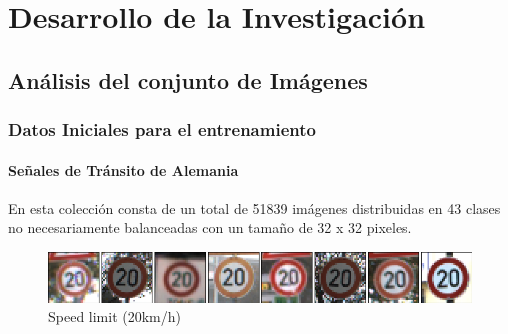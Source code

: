 \chapter{Desarrollo de la Investigación}
\setcounter{page}{59}
\renewcommand{\baselinestretch}{2} %

\section{Análisis del conjunto de Imágenes}

	\subsection{Datos Iniciales para el entrenamiento}

		\subsubsection{Señales de Tránsito de Alemania}

			En esta colección consta de un total de 51839 imágenes distribuidas en 43 clases no necesariamente balanceadas con un tamaño de 32 x 32 pixeles.

			\begin{figure}[H]
				\begin{center}
				\includegraphics[width=1\textwidth]{images/desarrollo/imagenes/alemania/1__(1).png}
				\end{center}
				\begin{center}
				\caption{\small{Speed limit (20km/h)}}
				\end{center}
				\vspace{-1.5em}
			\end{figure}


